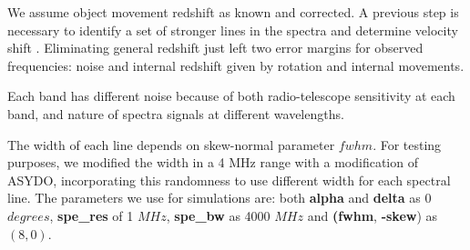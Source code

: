 We assume object movement redshift as known and corrected. 
A previous step is necessary to identify a set of stronger lines in the spectra and determine velocity shift \cite{sharpee_introducing_2003}.
Eliminating general redshift just left two error margins for observed frequencies: noise and internal redshift given by rotation and internal movements.

Each band has different noise because of both radio-telescope sensitivity at each band, and nature of spectra signals at different wavelengths.

The width of each line depends on skew-normal parameter $fwhm$.
For testing purposes, we modified the width in a 4 MHz range with a modification of ASYDO, incorporating this randomness to use different width for each spectral line.
The parameters we use for simulations are: both \textbf{alpha} and \textbf{delta} as 0 $degrees$, \textbf{spe\_res} of 1 $MHz$, \textbf{spe\_bw} as 4000 $MHz$ and \textbf{(fwhm}, \boldmath{$\alpha$} \textbf{-skew}) as $(8, 0)$.

